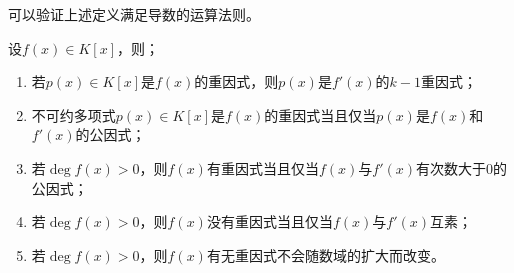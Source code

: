 \begin{note}
	可以验证上述定义满足导数的运算法则。
\end{note}
\begin{property}
	设$f(x)\in K[x]$，则；
	\begin{enumerate}
		\item 若$p(x)\in K[x]$是$f(x)$的重因式，则$p(x)$是$f'(x)$的$k-1$重因式；
		\item 不可约多项式$p(x)\in K[x]$是$f(x)$的重因式当且仅当$p(x)$是$f(x)$和$f'(x)$的公因式；
		\item 若$\deg f(x)>0$，则$f(x)$有重因式当且仅当$f(x)$与$f'(x)$有次数大于$0$的公因式；
		\item 若$\deg f(x)>0$，则$f(x)$没有重因式当且仅当$f(x)$与$f'(x)$互素；
		\item 若$\deg f(x)>0$，则$f(x)$有无重因式不会随数域的扩大而改变。
	\end{enumerate}
\end{property}
